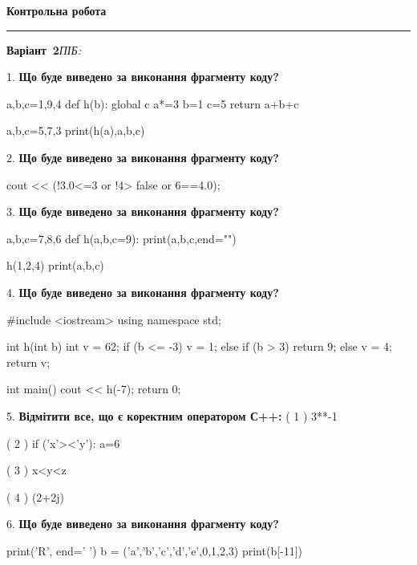 \documentclass[11pt]{article}
\begin{document}
{\centering\Large\bfseries Контрольна робота\par}
\medskip
\noindent\rule{\linewidth}{0.5pt}
\smallskip
\noindent\textbf{Варіант \No\,2}\hfill \textit{ПІБ:}\,\underline{\hspace{60mm}}
\vspace{4mm}

1. \textbf{Що буде виведено за виконання фрагменту коду?}

a,b,c=1,9,4
def h(b):
global c    a*=3
    b=1
    c=5
    return a+b+c

a,b,c=5,7,3
print(h(a),a,b,c)
\vspace{5mm}

2. \textbf{Що буде виведено за виконання фрагменту коду?}

cout << (!3.0<=3 or !4> false or 6==4.0);
\vspace{5mm}

3. \textbf{Що буде виведено за виконання фрагменту коду?}

a,b,c=7,8,6
def h(a,b,c=9):
    print(a,b,c,end="")

h(1,2,4)
print(a,b,c)

\vspace{5mm}

4. \textbf{Що буде виведено за виконання фрагменту коду?}

#include <iostream>
using namespace std;

int h(int b){
    int v = 62;
    if (b <= -3) 
        v = 1;
    else if (b > 3)
         return 9;
    else
         v = 4;
    return v;
}

int main(){
    cout << h(-7);
    return 0;
}

\vspace{5mm}

5. %
\textbf{Відмітити все, що є коректним оператором С++:}
( 1 ) 3**-1

( 2 ) if ('x'><'y'): a=6

( 3 ) x<y<z

( 4 ) (2+2j)%
\vspace{5mm}

6. \textbf{Що буде виведено за виконання фрагменту коду?}

print('R', end=' ')
b = ('a','b','c','d','e',0,1,2,3)
print(b[-11])

\vspace{5mm}
\end{document}
